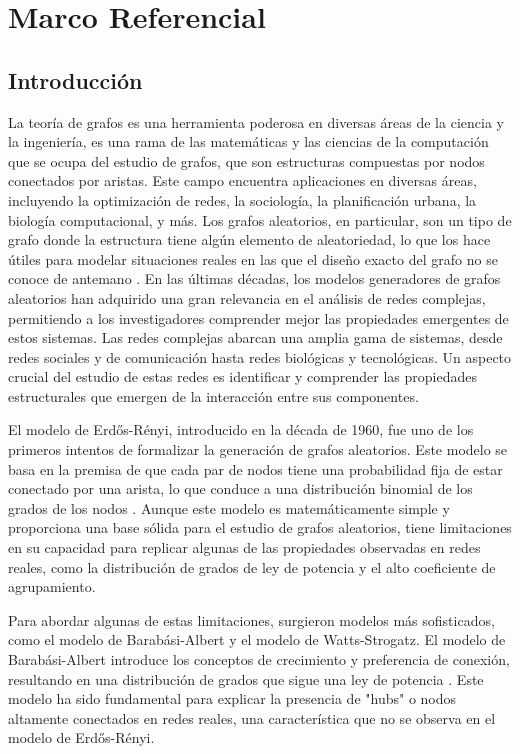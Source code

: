 \chapter{Marco Referencial}
\section{Introducción}
La teoría de grafos es una herramienta poderosa en diversas áreas de la ciencia y la ingeniería, es una rama de las matemáticas y las ciencias de la computación que se ocupa del estudio de grafos, que son estructuras compuestas por nodos conectados por aristas. Este campo encuentra aplicaciones en diversas áreas, incluyendo la optimización de redes, la sociología, la planificación urbana, la biología computacional, y más. Los grafos aleatorios, en particular, son un tipo de grafo donde la estructura tiene algún elemento de aleatoriedad, lo que los hace útiles para modelar situaciones reales en las que el diseño exacto del grafo no se conoce de antemano \citep{Newman2010}.
En las últimas décadas, los modelos generadores de grafos aleatorios han adquirido una gran relevancia en el análisis de redes complejas, permitiendo a los investigadores comprender mejor las propiedades emergentes de estos sistemas. Las redes complejas abarcan una amplia gama de sistemas, desde redes sociales y de comunicación hasta redes biológicas y tecnológicas. Un aspecto crucial del estudio de estas redes es identificar y comprender las propiedades estructurales que emergen de la interacción entre sus componentes.

El modelo de Erdős-Rényi, introducido en la década de 1960, fue uno de los primeros intentos de formalizar la generación de grafos aleatorios. Este modelo se basa en la premisa de que cada par de nodos tiene una probabilidad fija de estar conectado por una arista, lo que conduce a una distribución binomial de los grados de los nodos \citep{Erdos1959}. Aunque este modelo es matemáticamente simple y proporciona una base sólida para el estudio de grafos aleatorios, tiene limitaciones en su capacidad para replicar algunas de las propiedades observadas en redes reales, como la distribución de grados de ley de potencia y el alto coeficiente de agrupamiento.

Para abordar algunas de estas limitaciones, surgieron modelos más sofisticados, como el modelo de Barabási-Albert y el modelo de Watts-Strogatz. El modelo de Barabási-Albert introduce los conceptos de crecimiento y preferencia de conexión, resultando en una distribución de grados que sigue una ley de potencia \citep{Barabasi1999}. Este modelo ha sido fundamental para explicar la presencia de "hubs" o nodos altamente conectados en redes reales, una característica que no se observa en el modelo de Erdős-Rényi.

